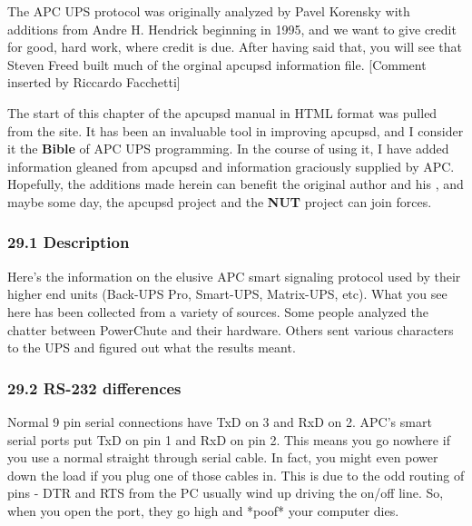 {{{{{{{{{{{{{{{{{\label{index-Smart-protocol-262}
\label{index-Protocol-Smart-263}
The APC UPS protocol was originally analyzed by Pavel Korensky with additions
from Andre H. Hendrick beginning in 1995, and we want to give credit for good,
hard work, where credit is due. After having said that, you will see that
Steven Freed built much of the orginal apcupsd information file. [Comment
inserted by Riccardo Facchetti]  

The start of this chapter of the apcupsd manual in HTML format was pulled from
the 
 site. It has been an
invaluable tool in improving apcupsd, and I consider it the {\bf Bible} of APC
UPS programming. In the course of using it, I have added information gleaned
from apcupsd and information graciously supplied by APC. Hopefully, the
additions made herein can benefit the original author and his 
, and maybe some day,
the apcupsd project and the {\bf NUT} project can join forces. 

\label{Description}

\subsubsection*{29.1 Description}

Here's the information on the elusive APC smart signaling protocol used by
their higher end units (Back-UPS Pro, Smart-UPS, Matrix-UPS, etc). What you
see here has been collected from a variety of sources. Some people analyzed
the chatter between PowerChute and their hardware. Others sent various
characters to the UPS and figured out what the results meant. 

\label{RS_002d232-differences}

\subsubsection*{29.2 RS-232 differences}

Normal 9 pin serial connections have TxD on 3 and RxD on 2. APC's smart serial
ports put TxD on pin 1 and RxD on pin 2. This means you go nowhere if you use
a normal straight through serial cable. In fact, you might even power down the
load if you plug one of those cables in. This is due to the odd routing of
pins - DTR and RTS from the PC usually wind up driving the on/off line. So,
when you open the port, they go high and *poof* your computer dies.  

}}}}}}}}}}}}}}}}}
